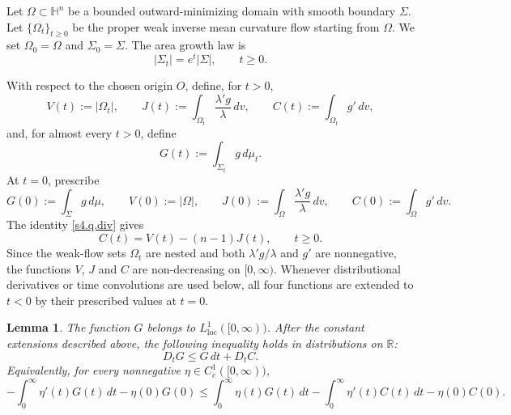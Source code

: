 \documentclass[11pt,reqno]{amsart}
\numberwithin{equation}{section}
\newtheorem{lemma}[theorem]{Lemma}
\theoremstyle{definition}
\newcommand{\HH}{\mathbb H}
\begin{document}
Let $\Omega\subset\HH^n$ be a bounded outward-minimizing domain with smooth boundary $\Sigma$.  Let $\{\Omega_t\}_{t\geq0}$ be the proper weak inverse mean curvature flow starting from $\Omega$.  We set $\Omega_0=\Omega$ and $\Sigma_0=\Sigma$.  The area growth law is
\begin{equation*}
    |\Sigma_t|=e^t|\Sigma|,
    \qquad t\geq0.
\end{equation*}

With respect to the chosen origin $O$, define, for $t>0$,
\begin{equation*}
    V(t):=|\Omega_t|,\qquad
    J(t):=\int_{\Omega_t}\frac{\lambda'g}{\lambda}\,dv,\qquad
    C(t):=\int_{\Omega_t}g'\,dv,
\end{equation*}
and, for almost every $t>0$, define
\begin{equation*}
    G(t):=\int_{\Sigma_t}g\,d\mu_t.
\end{equation*}
At $t=0$, prescribe
\begin{equation*}
    G(0):=\int_\Sigma g\,d\mu,\qquad
    V(0):=|\Omega|,\qquad
    J(0):=\int_\Omega\frac{\lambda'g}{\lambda}\,dv,\qquad
    C(0):=\int_\Omega g'\,dv.
\end{equation*}
The identity \eqref{s4.q.div} gives
\begin{equation*}
    C(t)=V(t)-(n-1)J(t),
    \qquad t\geq0.
\end{equation*}
Since the weak-flow sets $\Omega_t$ are nested and both
$\lambda'g/\lambda$ and $g'$ are nonnegative, the functions
$V$, $J$ and $C$ are non-decreasing on $[0,\infty)$. Whenever
distributional derivatives or time convolutions are used below, all four functions are extended to $t<0$ by their prescribed values at $t=0$.

\begin{lemma}\label{lem:hyp-weak-transport-G}
The function $G$ belongs to $L^1_{\mathrm{loc}}([0,\infty))$.  After the constant extensions described above, the following inequality holds in distributions on $\mathbb R$:
\begin{equation}\label{eq:hyp-measure-transport}
    D_tG\leq G\,dt+D_tC.
\end{equation}
Equivalently, for every nonnegative $\eta\in C_c^1([0,\infty))$,
\begin{equation}\label{eq:hyp-transport-test}
    -\int_0^\infty\eta'(t)G(t)\,dt-\eta(0)G(0)
    \leq
    \int_0^\infty\eta(t)G(t)\,dt
    -\int_0^\infty\eta'(t)C(t)\,dt-\eta(0)C(0).
\end{equation}
\end{lemma}
\end{document}
